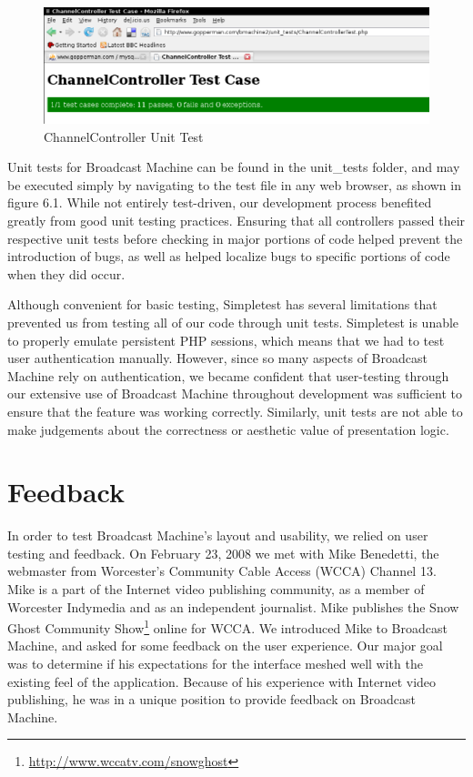\documentclass[a4paper,12pt]{report}
\begin{document}
\begin{figure}[h]
\begin{center}
\includegraphics[scale=0.45]{./images/unittest.png}
\end{center}
\caption{ChannelController Unit Test}
\end{figure}

Unit tests for Broadcast Machine can be found in the unit\_tests folder, and may be executed simply by navigating to the test file in any web browser, as shown in figure 6.1. While not entirely test-driven, our development process benefited greatly from good unit testing practices. Ensuring that all controllers passed their respective unit tests before checking in major portions of code helped prevent the introduction of bugs, as well as helped localize bugs to specific portions of code when they did occur. 

Although convenient for basic testing, Simpletest has several limitations that prevented us from testing all of our code through unit tests. Simpletest is unable to properly emulate persistent PHP sessions, which means that we had to test user authentication manually. However, since so many aspects of Broadcast Machine rely on authentication, we became confident that user-testing through our extensive use of Broadcast Machine throughout development was sufficient to ensure that the feature was working correctly. Similarly, unit tests are not able to make judgements about the correctness or aesthetic value of presentation logic. 

\section{Feedback}

In order to test Broadcast Machine's layout and usability, we relied on user testing and feedback. On February 23, 2008 we met with Mike Benedetti, the webmaster from Worcester's Community Cable Access (WCCA) Channel 
13. Mike is a part of the Internet video publishing community, as a member of Worcester Indymedia and as an independent journalist. Mike 
publishes the Snow Ghost Community Show\footnote{\url{http://www.wccatv.com/snowghost}} online for WCCA.
We introduced Mike to Broadcast Machine, and asked for some feedback on the user experience.
Our major goal was to determine if his expectations for the interface meshed well with the existing feel of the application.
Because of his experience with Internet video publishing, he was in a unique position to provide feedback on Broadcast Machine.
\end{document}
